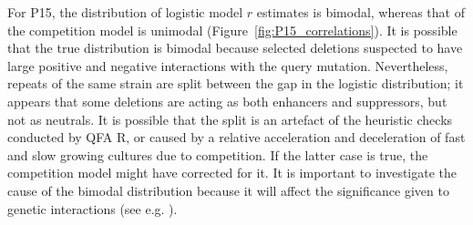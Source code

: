 
For P15, the distribution of logistic model \(r\) estimates is
bimodal, whereas that of the competition model is unimodal
(Figure~\ref{fig:P15_correlations}). It is possible that the true
distribution is bimodal because \citet{Addinall2011} selected
deletions suspected to have large positive and negative interactions
with the query mutation. Nevertheless, repeats of the same strain are
split between the gap in the logistic distribution; it appears that
some deletions are acting as both enhancers and suppressors, but not
as neutrals. It is possible that the split is an artefact of the
heuristic checks conducted by QFA R, or caused by a relative
acceleration and deceleration of fast and slow growing cultures due to
competition. If the latter case is true, the competition model might
have corrected for it.
It is important to investigate the cause of the bimodal distribution
because it will affect the significance given to genetic interactions
(see e.g. \citet{Addinall2011}).



